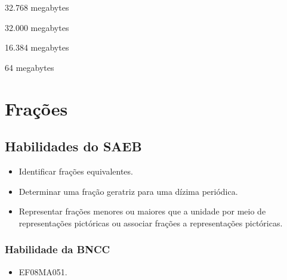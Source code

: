 \begin{escolha}[itemsep=0pt]
\item 32.768 megabytes
\item 32.000 megabytes
\item 16.384 megabytes
\item 64 megabytes
\end{escolha}






\chapter{Frações}

\section{Habilidades do SAEB}

\begin{itemize}
\item
  Identificar frações equivalentes.
\item
  Determinar uma fração geratriz para uma dízima periódica.
  \item Representar frações menores ou maiores que a
unidade por meio de representações pictóricas ou associar frações a
representações pictóricas.
\end{itemize}

\subsection{Habilidade da BNCC}

\begin{itemize}
  \item EF08MA051.
\end{itemize}

